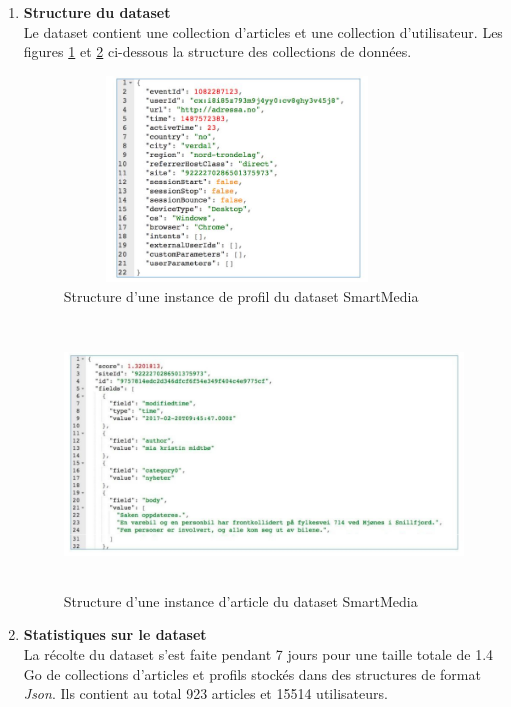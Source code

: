     \begin{enumerate}[leftmargin=*]
        \item\textbf{Structure du dataset}\\
        Le dataset contient une collection d'articles et une collection d'utilisateur. Les figures \ref{instance-profil} et \ref{instance-article} ci-dessous la structure des collections de données.
        \begin{figure}[H]
            \centering
            \includegraphics[height=155pt,width=260pt]{img/chapter4/smartmedia/structure_profil.jpg}
            \caption{Structure d'une instance de profil du dataset SmartMedia}
            \label{instance-profil}
        \end{figure}
        
        \begin{figure}[H]
            \centering
            \includegraphics[height=200pt,width=330pt]{img/chapter4/smartmedia/structure.png}
            \caption{Structure d'une instance d'article du dataset SmartMedia}
            \label{instance-article}
        \end{figure}

        \item\textbf{Statistiques sur le dataset}\\
        La récolte du dataset s'est faite pendant 7 jours pour une taille totale de 1.4 Go de collections d'articles et profils stockés dans des structures de format \emph{Json}. Ils contient au total 923 articles et 15514 utilisateurs.\\


\end{enumerate}
